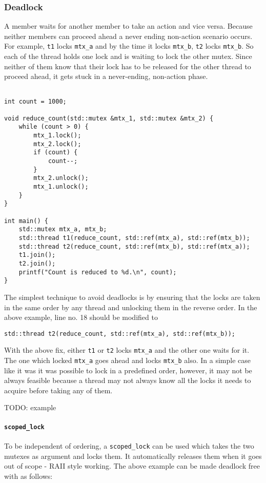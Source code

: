 \documentclass{scrartcl}
\begin{document}
\subsubsection{Deadlock}
A member waits for another member to take an action and vice versa. Because neither members can proceed ahead a never ending non-action scenario occurs. For example, \texttt{t1} locks \texttt{mtx_a} and by the time it locks \texttt{mtx_b}, \texttt{t2} locks \texttt{mtx_b}. So each of the thread holds one lock and is waiting to lock the other mutex. Since neither of them know that their lock has to be released for the other thread to proceed ahead, it gets stuck in a never-ending, non-action phase.

\begin{verbatim}

int count = 1000;

void reduce_count(std::mutex &mtx_1, std::mutex &mtx_2) {
    while (count > 0) {
        mtx_1.lock();
        mtx_2.lock();
        if (count) {
            count--;
        }
        mtx_2.unlock();
        mtx_1.unlock();
    }
}

int main() {
    std::mutex mtx_a, mtx_b;
    std::thread t1(reduce_count, std::ref(mtx_a), std::ref(mtx_b));
    std::thread t2(reduce_count, std::ref(mtx_b), std::ref(mtx_a));
    t1.join();
    t2.join();
    printf("Count is reduced to %d.\n", count);
}

\end{verbatim}

The simplest technique to avoid deadlocks is by ensuring that the locks are taken in the same order by any thread and unlocking them in the reverse order. In the above example, line no. 18 should be modified to 
\begin{verbatim}
std::thread t2(reduce_count, std::ref(mtx_a), std::ref(mtx_b));
\end{verbatim}

With the above fix, either \texttt{t1} or \texttt{t2} locks \texttt{mtx_a} and the other one waits for it. The one which locked \texttt{mtx_a} goes ahead and locks \texttt{mtx_b} also. In a simple case like it was it was possible to lock in a predefined order, however, it may not be always feasible because a thread may not always know all the locks it needs to acquire before taking any of them.

TODO: example

\paragraph{\texttt{scoped_lock}} 
To be independent of ordering, a \texttt{scoped_lock} can be used which takes the two mutexes as argument and locks them. It automatically releases them when it goes out of scope - RAII style working. The above example can be made deadlock free with as follows:
\end{document}
